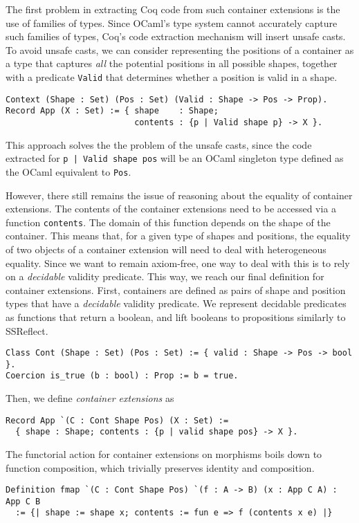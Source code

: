 \documentclass[a4paper, UKenglish, cleveref, autoref, thm-restate]{lipics-v2021}
\begin{document}
The first problem in extracting Coq code from such container extensions is the
use of families of types. Since OCaml's type system cannot accurately capture
such families of types, Coq's code extraction mechanism will insert unsafe
casts. To avoid unsafe casts, we can consider representing the positions of a
container as a type that captures \emph{all} the potential positions in all
possible shapes, together with a predicate \texttt{Valid} that
determines whether a position is valid in a shape. 
\begin{verbatim}
Context (Shape : Set) (Pos : Set) (Valid : Shape -> Pos -> Prop).
Record App (X : Set) := { shape    : Shape; 
                          contents : {p | Valid shape p} -> X }.
\end{verbatim}
This approach solves the the problem of the unsafe casts, since the code
extracted for \texttt{{p | Valid shape pos}} will be an OCaml
singleton type defined as the OCaml equivalent to \texttt{Pos}.

However, there still remains the issue of reasoning about the equality of
container extensions. The contents of the container extensions need to be
accessed via a function \texttt{contents}. The domain of this function
depends on the shape of the container. This means that, for a given type of
shapes and positions, the equality of two objects of a container extension will
need to deal with heterogeneous equality. Since we want to remain axiom-free,
one way to deal with this is to rely on a \emph{decidable} validity predicate.
This way, we reach our final definition for container extensions. First,
containers are defined as pairs of shape and position types that have a
\emph{decidable} validity predicate. We represent decidable predicates as
functions that return a boolean, and lift booleans to propositions similarly to
SSReflect.
\begin{verbatim}
Class Cont (Shape : Set) (Pos : Set) := { valid : Shape -> Pos -> bool }.
Coercion is_true (b : bool) : Prop := b = true.
\end{verbatim}
Then, we define \emph{container extensions} as
\begin{verbatim}
Record App `(C : Cont Shape Pos) (X : Set) :=
  { shape : Shape; contents : {p | valid shape pos} -> X }.
\end{verbatim}

The functorial action for container extensions on morphisms boils down to
function composition, which trivially preserves identity and composition.
\begin{verbatim}
Definition fmap `(C : Cont Shape Pos) `(f : A -> B) (x : App C A) : App C B
  := {| shape := shape x; contents := fun e => f (contents x e) |}
\end{verbatim}
\end{document}
